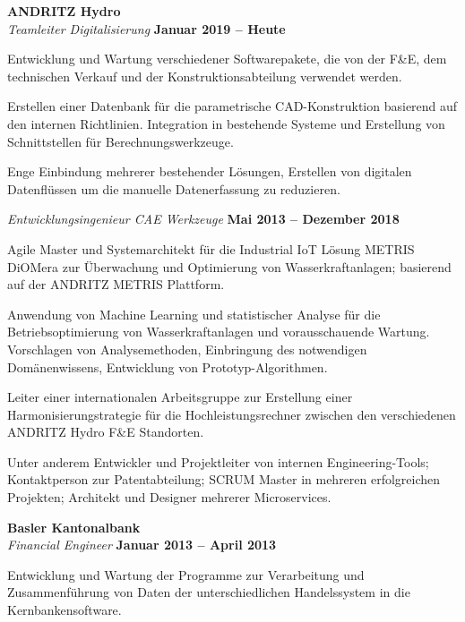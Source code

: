\documentclass[line,11pt,a4paper]{../resume}
\begin{document}
\begin{resume}
\textbf{ANDRITZ Hydro}\\\vspace{1mm}%
\textsl{Teamleiter Digitalisierung} \hfill \textbf{Januar 2019 -- Heute}\\
\vspace{-4mm}%
\begin{list2}
  \item Entwicklung und Wartung verschiedener Softwarepakete, die von der F\&E,
    dem technischen Verkauf und der Konstruktionsabteilung verwendet werden.
  \item Erstellen einer Datenbank für die parametrische CAD-Konstruktion
    basierend auf den internen Richtlinien. Integration in bestehende Systeme
    und Erstellung von Schnittstellen für Berechnungswerkzeuge.
  \item Enge Einbindung mehrerer bestehender Lösungen, Erstellen von digitalen
    Datenflüssen um die manuelle Datenerfassung zu reduzieren.
\end{list2}

\textsl{Entwicklungsingenieur CAE Werkzeuge} \hfill \textbf{Mai 2013 -- Dezember 2018}\\
\vspace{-4mm}%
\begin{list2}
  \item Agile Master und Systemarchitekt für die Industrial IoT Lösung METRIS
    DiOMera zur Überwachung und Optimierung von Wasserkraftanlagen; basierend
    auf der ANDRITZ METRIS Plattform.

  \item Anwendung von Machine Learning und statistischer Analyse für die
    Betriebsoptimierung von Wasserkraftanlagen und vorausschauende Wartung.
    Vorschlagen von Analysemethoden, Einbringung des notwendigen
    Domänenwissens, Entwicklung von Prototyp-Algorithmen.

  \item Leiter einer internationalen Arbeitsgruppe zur Erstellung
    einer Harmonisierungstrategie für die Hochleistungsrechner zwischen den
    verschiedenen ANDRITZ Hydro F\&E Standorten.

  \item Unter anderem Entwickler und Projektleiter von internen
    Engineering-Tools; Kontaktperson zur Patentabteilung; SCRUM Master in
    mehreren erfolgreichen Projekten; Architekt und Designer mehrerer
    Microservices.
\end{list2}

\textbf{Basler Kantonalbank}\\\vspace{1mm}%
\textsl{Financial Engineer} \hfill \textbf{Januar 2013 -- April 2013}\\
\vspace{-4mm}%
\begin{list2}
  \item Entwicklung und Wartung der Programme zur Verarbeitung und
    Zusammenführung von Daten der unterschiedlichen Handelssystem in die
    Kernbankensoftware.
\end{list2}


\end{resume}
\end{document}
